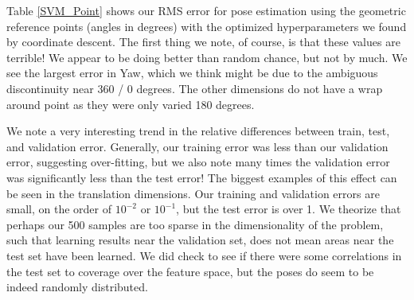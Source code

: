 \documentclass[journal]{IEEEtran}
\begin{document}
Table \ref{SVM_Point} shows our RMS error for pose estimation using the geometric reference points (angles in degrees) with the optimized hyperparameters we found by coordinate descent. The first thing we note, of course, is that these values are terrible! We appear to be doing better than random chance, but not by much. We see the largest error in Yaw, which we think might be due to the ambiguous discontinuity near 360 / 0 degrees. The other dimensions do not have a wrap around point as they were only varied 180 degrees.

We note a very interesting trend in the relative differences between train, test, and validation error. Generally, our training error was less than our validation error, suggesting over-fitting, but we also note many times the validation error was significantly less than the test error! The biggest examples of this effect can be seen in the translation dimensions. Our training and validation errors are small, on the order of $10^{-2}$ or $10^{-1}$, but the test error is over 1. We theorize that perhaps our 500 samples are too sparse in the dimensionality of the problem, such that learning results near the validation set, does not mean areas near the test set have been learned. We did check to see if there were some correlations in the test set to coverage over the feature space, but the poses do seem to be indeed randomly distributed.
\end{document}
